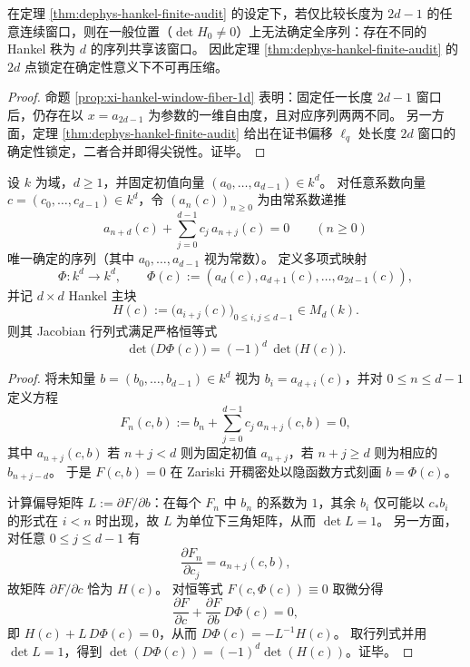 \begin{corollary}\label{cor:xi-hankel-2d-sharpness}
在定理 \ref{thm:dephys-hankel-finite-audit} 的设定下，若仅比较长度为 \(2d-1\) 的任意连续窗口，则在一般位置（\(\det H_0\neq 0\)）上无法确定全序列：存在不同的 Hankel 秩为 \(d\) 的序列共享该窗口。
因此定理 \ref{thm:dephys-hankel-finite-audit} 的 \(2d\) 点锁定在确定性意义下不可再压缩。
\end{corollary}
\begin{proof}
命题 \ref{prop:xi-hankel-window-fiber-1d} 表明：固定任一长度 \(2d-1\) 窗口后，仍存在以 \(x=a_{2d-1}\) 为参数的一维自由度，且对应序列两两不同。
另一方面，定理 \ref{thm:dephys-hankel-finite-audit} 给出在证书偏移 \(\ell_q\) 处长度 \(2d\) 窗口的确定性锁定，二者合并即得尖锐性。证毕。
\end{proof}



\begin{theorem}\label{thm:xi-hankel-recurrence-jacobian-identity}
设 \(k\) 为域，\(d\ge 1\)，并固定初值向量 \((a_0,\dots,a_{d-1})\in k^d\)。
对任意系数向量 \(c=(c_0,\dots,c_{d-1})\in k^d\)，令 \((a_n(c))_{n\ge 0}\) 为由常系数递推
\[
a_{n+d}(c)+\sum_{j=0}^{d-1}c_j\,a_{n+j}(c)=0\qquad(n\ge 0)
\]
唯一确定的序列（其中 \(a_0,\dots,a_{d-1}\) 视为常数）。
定义多项式映射
\[
\Phi:k^d\to k^d,\qquad \Phi(c):=(a_d(c),a_{d+1}(c),\dots,a_{2d-1}(c)),
\]
并记 \(d\times d\) Hankel 主块
\[
H(c):=\bigl(a_{i+j}(c)\bigr)_{0\le i,j\le d-1}\in M_d(k).
\]
则其 Jacobian 行列式满足严格恒等式
\[
\det\bigl(D\Phi(c)\bigr)=(-1)^d\,\det\bigl(H(c)\bigr).
\]
\end{theorem}
\begin{proof}
将未知量 \(b=(b_0,\dots,b_{d-1})\in k^d\) 视为 \(b_i=a_{d+i}(c)\)，并对 \(0\le n\le d-1\) 定义方程
\[
F_n(c,b):=b_n+\sum_{j=0}^{d-1}c_j\,a_{n+j}(c,b)=0,
\]
其中 \(a_{n+j}(c,b)\) 若 \(n+j<d\) 则为固定初值 \(a_{n+j}\)，若 \(n+j\ge d\) 则为相应的 \(b_{n+j-d}\)。
于是 \(F(c,b)=0\) 在 Zariski 开稠密处以隐函数方式刻画 \(b=\Phi(c)\)。
\par
计算偏导矩阵 \(L:=\partial F/\partial b\)：在每个 \(F_n\) 中 \(b_n\) 的系数为 \(1\)，其余 \(b_i\) 仅可能以 \(c_\ast b_i\) 的形式在 \(i<n\) 时出现，故 \(L\) 为单位下三角矩阵，从而 \(\det L=1\)。
另一方面，对任意 \(0\le j\le d-1\) 有
\[
\frac{\partial F_n}{\partial c_j}=a_{n+j}(c,b),
\]
故矩阵 \(\partial F/\partial c\) 恰为 \(H(c)\)。
对恒等式 \(F(c,\Phi(c))\equiv 0\) 取微分得
\[
\frac{\partial F}{\partial c}+\frac{\partial F}{\partial b}\,D\Phi(c)=0,
\]
即 \(H(c)+L\,D\Phi(c)=0\)，从而 \(D\Phi(c)=-L^{-1}H(c)\)。
取行列式并用 \(\det L=1\)，得到 \(\det(D\Phi(c))=(-1)^d\det(H(c))\)。证毕。
\end{proof}

